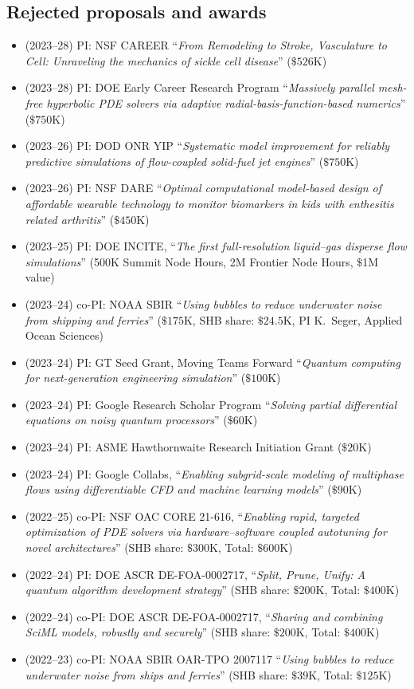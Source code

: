 \subsection{Rejected proposals and awards}

\begin{itemize}

    \item (2023--28) PI: NSF CAREER ``\textit{From Remodeling to Stroke, Vasculature to Cell: Unraveling the mechanics of sickle cell disease}'' ($\$526$K)
    \item (2023--28) PI: DOE Early Career Research Program ``\textit{Massively parallel mesh-free hyperbolic PDE solvers via adaptive radial-basis-function-based numerics}'' ($\$750$K)
    \item (2023--26) PI: DOD ONR YIP ``\textit{Systematic model improvement for reliably predictive simulations of flow-coupled solid-fuel jet engines}'' ($\$750$K)
    \item (2023--26) PI: NSF DARE ``\textit{Optimal computational model-based design of affordable wearable technology to monitor biomarkers in kids with enthesitis related arthritis}'' ($\$450$K)
    \item (2023--25) PI: DOE INCITE, ``\textit{The first full-resolution liquid--gas disperse flow simulations}'' (500K Summit Node Hours, 2M Frontier Node Hours, $\$$1M value)
    \item (2023--24) co-PI: NOAA SBIR ``\textit{Using bubbles to reduce underwater noise from shipping and ferries}'' ($\$175$K, SHB share: $\$24.5$K, PI K.\ Seger, Applied Ocean Sciences)
    \item (2023--24) PI: GT Seed Grant, Moving Teams Forward ``\textit{Quantum computing for next-generation engineering simulation}'' ($\$100$K)
    \item (2023--24) PI: Google Research Scholar Program ``\textit{Solving partial differential equations on noisy quantum processors}'' ($\$60$K)
    \item (2023--24) PI: ASME Hawthornwaite Research Initiation Grant ($\$20$K)
    \item (2023--24) PI: Google Collabs, ``\textit{Enabling subgrid-scale modeling of multiphase flows using differentiable CFD and machine learning models}'' ($\$90$K)
    \item (2022--25) co-PI: NSF OAC CORE 21-616, ``\textit{Enabling rapid, targeted optimization of PDE solvers via hardware--software coupled autotuning for novel architectures}'' (SHB share: $\$300$K, Total: $\$600$K)
    \item (2022--24) PI: DOE ASCR DE-FOA-0002717, ``\textit{Split, Prune, Unify: A quantum algorithm development strategy}'' (SHB share: $\$200$K, Total: $\$400$K)
    \item (2022--24) co-PI: DOE ASCR DE-FOA-0002717, ``\textit{Sharing and combining SciML models, robustly and securely}'' (SHB share: $\$200$K, Total: $\$400$K)
    \item (2022--23) co-PI: NOAA SBIR OAR-TPO 2007117 ``\textit{Using bubbles to reduce underwater noise from ships and ferries}'' (SHB share: $\$39$K, Total: $\$125$K)
\end{itemize}
